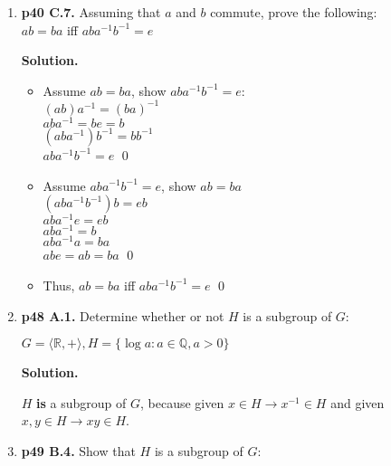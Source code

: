 \documentclass[11pt]{article}
\begin{document}
\begin{enumerate}
  Thus we know there exists $z \in G$, where $z = x^{-1}y$, such that $y = xz$. \qed \\

\item {\bfseries p40 C.7.} Assuming that $a$ and $b$ commute, prove the following: \\
  $ab = ba$ iff $aba^{-1}b^{-1} = e$
  
  {\bfseries Solution.}
  
  \begin{itemize}
  
	  \item Assume $ab = ba$, show $aba^{-1}b^{-1} = e$: \\
	  $(ab)a^{-1} = (ba)^{-1}$ \\
	  $aba^{-1} = be = b$ \\
	  $(aba^{-1})b^{-1} = bb^{-1}$ \\
	  $aba^{-1}b^{-1} = e$ \qed \\
	  
	  
	  \item Assume $aba^{-1}b^{-1} = e$, show $ab = ba$ \\
	  $(aba^{-1}b^{-1})b = eb$ \\
	  $aba^{-1}e = eb$ \\
	  $aba^{-1} = b$ \\
	  $aba^{-1}a = ba$ \\
	  $abe = ab = ba$ \qed \\
	  
	  \item Thus, $ab = ba$ iff $aba^{-1}b^{-1} = e$ \qed
  
  \end{itemize}
  
\newpage
 
\item {\bfseries p48 A.1.} Determine whether or not $H$ is a subgroup of $G$:
  
  $G = \langle \mathbb{R},+\rangle, H = \{\log a : a \in \mathbb{Q}, a>0\}$
  
  {\bfseries Solution.}
  
  $H$ {\bfseries is} a subgroup of $G$, because given $x \in H \rightarrow x^{-1} \in H$ and given $x,y \in H \rightarrow xy \in H$. \\

\item {\bfseries p49 B.4.} Show that $H$ is a subgroup of $G$:
  

\end{enumerate}
\end{document}
